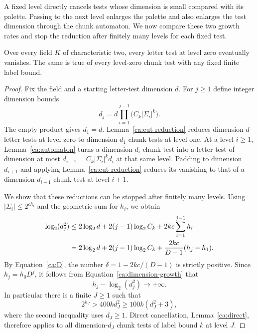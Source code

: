A fixed level directly cancels tests whose dimension is small compared
with its palette. Passing to the next level enlarges the palette and
also enlarges the test dimension through the chunk automaton. We now
compare these two growth rates and stop the reduction after finitely
many levels for each fixed test.

\begin{proposition}
\label{ca:all-tests}
Over every field $K$ of characteristic two, every letter test at level
zero eventually vanishes.  The same is true of every level-zero chunk
test with any fixed finite label bound.
\end{proposition}

\begin{proof}
Fix the field and a starting letter-test dimension $d$.  For $j\geq1$
define integer dimension bounds
\begin{equation}
  d_j=d\prod_{i=1}^{j-1}\bigl(C_k|\Sigma_i|^k\bigr).
  \label{ca:dimension-product}
\end{equation}
The empty product gives $d_1=d$.  Lemma~\ref{ca:cut-reduction} reduces
dimension-$d$ letter tests at level zero to dimension-$d_1$ chunk tests
at level one.  At a level $i\geq1$, Lemma~\ref{ca:automaton} turns a
dimension-$d_i$ chunk test into a letter test of dimension at most
$d_{i+1}=C_k|\Sigma_i|^kd_i$ at that same level.  Padding to dimension
$d_{i+1}$ and applying Lemma~\ref{ca:cut-reduction} reduces its vanishing
to that of a dimension-$d_{i+1}$ chunk test at level $i+1$.

We show that these reductions can be stopped after finitely many levels.
Using $|\Sigma_i|\leq2^{ch_i}$ and the geometric sum for $h_i$, we obtain
\begin{align}
  \log_2(d_j^2)
  &\leq 2\log_2 d+2(j-1)\log_2 C_k
       +2kc\sum_{i=1}^{j-1}h_i \notag\\
  &=2\log_2 d+2(j-1)\log_2 C_k
       +\frac{2kc}{D-1}(h_j-h_1).
  \label{ca:dimension-growth}
\end{align}
By Equation~\eqref{ca:D}, the number
$\delta=1-2kc/(D-1)$ is strictly positive.  Since $h_j=h_0D^j$, it follows
from Equation~\eqref{ca:dimension-growth} that
\[
  h_j-\log_2(d_j^2)\longrightarrow+\infty.
\]
In particular there is a finite $J\geq1$ such that
\[
  2^{h_J}>400k d_J^2\geq100k(d_J^2+3),
\]
where the second inequality uses $d_J\geq1$.  Direct cancellation,
Lemma~\ref{ca:direct}, therefore applies to all dimension-$d_J$ chunk
tests of label bound $k$ at level $J$.


\end{proof}
